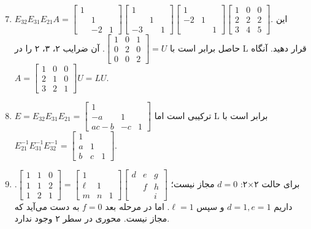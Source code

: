 \documentclass[12pt,a4paper]{article}
\begin{document}
{		
		\begin{enumerate}
			\setcounter{enumi}{6}
			\item $E_{32}E_{31}E_{21}A = \begin{bmatrix} 1 & & \\ & 1 & \\ & -2 & 1 \end{bmatrix} \begin{bmatrix} 1 & & \\ & 1 & \\ -3 & & 1 \end{bmatrix} \begin{bmatrix} 1 & & \\ -2 & 1 & \\ & & 1 \end{bmatrix} \begin{bmatrix} 1 & 0 & 0 \\ 2 & 2 & 2 \\ 3 & 4 & 5 \end{bmatrix}$. این حاصل برابر است با $\begin{bmatrix} 1 & 0 & 1 \\ 0 & 2 & 0 \\ 0 & 0 & 2 \end{bmatrix} = U$. آن ضرایب ۲، ۳، ۲ را در L قرار دهید. آنگاه $A = \begin{bmatrix} 1 & 0 & 0 \\ 2 & 1 & 0 \\ 3 & 2 & 1 \end{bmatrix} U = LU$.
			
			\item $E = E_{32}E_{31}E_{21} = \begin{bmatrix} 1 & & \\ -a & 1 & \\ ac-b & -c & 1 \end{bmatrix}$ ترکیبی است اما L برابر است با $E_{21}^{-1}E_{31}^{-1}E_{32}^{-1} = \begin{bmatrix} 1 & & \\ a & 1 & \\ b & c & 1 \end{bmatrix}$.
			
			\item برای حالت ۲×۲: $d=0$ مجاز نیست؛ $\begin{bmatrix} 1 & 1 & 0 \\ 1 & 1 & 2 \\ 1 & 2 & 1 \end{bmatrix} = \begin{bmatrix} 1 & & \\ \ell & 1 & \\ m & n & 1 \end{bmatrix} \begin{bmatrix} d & e & g \\ & f & h \\ & & i \end{bmatrix}$. داریم $d=1, e=1$ و سپس $\ell=1$. اما در مرحله بعد $f=0$ به دست می‌آید که مجاز نیست. محوری در سطر ۲ وجود ندارد.
			

\end{enumerate}}
\end{document}
